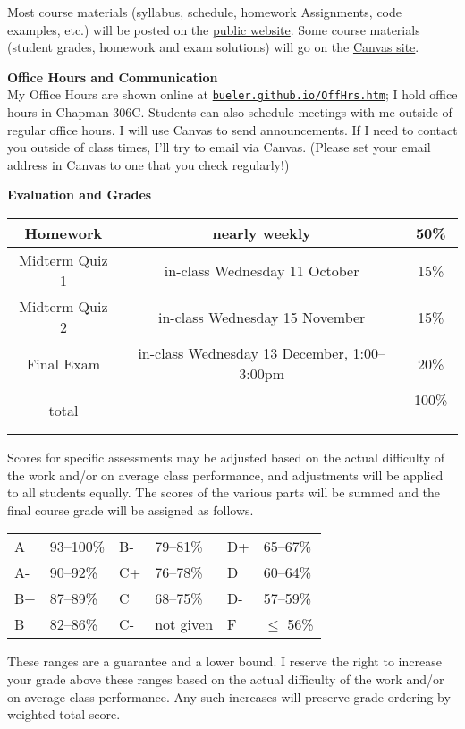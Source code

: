 \documentclass[12pt]{article}
\renewcommand{\emph}[1]{\textsf{\textbf{#1}}}
\newcommand{\localhead}[1]{\par\smallskip\textbf{#1} \smallskip\nobreak\\}%
\def\heading#1{\localhead{\large\emph{#1}}}
\begin{document}
Most course materials (syllabus, schedule, homework Assignments, code examples, etc.) will be posted on the \href{https://bueler.github.io/nla/}{public website}.  Some course materials (student grades, homework and exam solutions) will go on the \href{https://canvas.alaska.edu/courses/15800}{Canvas site}.


\heading{Office Hours and Communication}
My Office Hours are shown online at \href{http://bueler.github.io/OffHrs.htm}{\texttt{bueler.github.io/OffHrs.htm}}; I hold office hours in Chapman 306C.  Students can also schedule meetings with me outside of regular office hours.  I will use Canvas to send announcements.  If I need to contact you outside of class times, I'll try to email via Canvas.  (Please set your email address in Canvas to one that you check regularly!)


\clearpage\newpage
\phantom{foo}
\heading{Evaluation and Grades}
\vskip -10pt

\begin{tabular}{|c|c|c|}
\hline
Homework & nearly weekly & 50\% \\
\hline
Midterm Quiz 1 & in-class Wednesday 11 October  & 15\%  \\
\hline
Midterm Quiz 2 & in-class Wednesday 15 November & 15\%  \\
\hline
Final Exam     & in-class Wednesday 13 December, 1:00--3:00pm & 20\% \\
\hline
total & & 100\% \, \\
\hline
\end{tabular}

Scores for specific assessments may be adjusted based on the actual difficulty of the work and/or on average class performance, and adjustments will be applied to all students equally.  The scores of the various parts will be summed and the final course grade will be assigned as follows.

\begin{tabular}{llllll}
A  & 93--100\% & B- & 79--81\%  & D+ & 65--67\%  \\
A- & 90--92\%  & C+ & 76--78\%  & D  & 60--64\%  \\
B+ & 87--89\%  & C  & 68--75\%  & D- & 57--59\%  \\
B  & 82--86\%  & C- & not given & F  & $\le$ 56\%
\end{tabular}

These ranges are a guarantee and a lower bound.  I reserve the right to increase your grade above these ranges based on the actual difficulty of the work and/or on average class performance.  Any such increases will preserve grade ordering by weighted total score.
\end{document}
